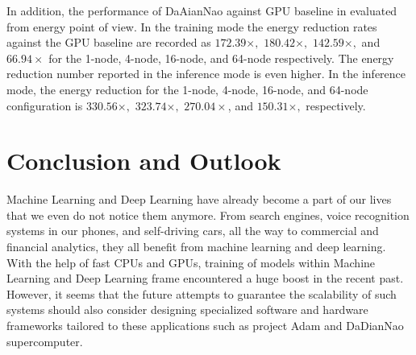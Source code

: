 \documentclass[runningheads,a4paper]{llncs}
\begin{document}
{In addition, the performance of DaAianNao against GPU baseline in evaluated from energy point of view. In the training mode the energy reduction rates against the GPU baseline are recorded as $172.39\times,$ $180.42\times,$ $142.59\times,$ and $66.94\times$ for the 1-node, 4-node, 16-node, and 64-node respectively. The energy reduction number reported in the inference mode is even higher. In the inference mode, the energy reduction for the 1-node, 4-node, 16-node, and 64-node configuration is $330.56\times,$ $323.74\times,$ $270.04\times$, and $150.31\times,$ respectively.


\section*{Conclusion and Outlook}
Machine Learning and Deep Learning have already become a part of our lives that we even do not notice them anymore. From search engines, voice recognition systems in our phones, and self-driving cars, all the way to commercial and financial analytics, they all benefit from machine learning and deep learning. With the help of fast CPUs and GPUs, training of models within Machine Learning and Deep Learning frame encountered a huge boost in the recent past. However, it seems that the future attempts to guarantee the scalability of such systems should also consider designing specialized software and hardware frameworks tailored to these applications such as project Adam and DaDianNao supercomputer.\\
}
\end{document}
